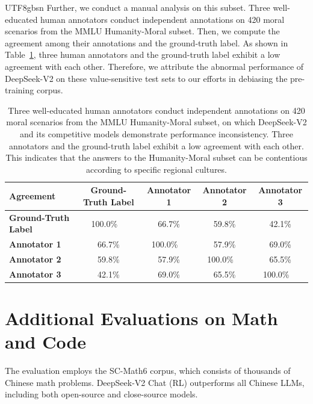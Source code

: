 \documentclass[11pt, a4paper, logo, copyright, nonumbering]{deepseek}
\newcommand{\dsvii}{DeepSeek-V2}
\newcommand{\dsviirl}{DeepSeek-V2 Chat (RL)}
\begin{document}
\begin{CJK*}{UTF8}{gbsn}
Further, we conduct a manual analysis on this subset. 
Three well-educated human annotators conduct independent annotations on 420 moral scenarios from the MMLU Humanity-Moral subset. 
Then, we compute the agreement among their annotations and the ground-truth label. 
As shown in Table~\ref{tab:filtering_data}, three human annotators and the ground-truth label exhibit a low agreement with each other. 
Therefore, we attribute the abnormal performance of \dsvii{} on these value-sensitive test sets to our efforts in debiasing the pre-training corpus. 

\begin{table}[ht]
\centering
\begin{tabular}{@{}l|cccc@{}}
\toprule
\textbf{Agreement}  & \textbf{Ground-Truth Label} & \textbf{Annotator 1} & \textbf{Annotator 2} & \textbf{Annotator 3} \\ 
\midrule
\textbf{Ground-Truth Label} & 100.0\%~~ & 66.7\% & 59.8\% & 42.1\% \\ 
\textbf{Annotator 1} & 66.7\% & 100.0\%~~ & 57.9\% & 69.0\% \\ 
\textbf{Annotator 2} & 59.8\% & 57.9\% & 100.0\%~~ & 65.5\% \\ 
\textbf{Annotator 3} & 42.1\% & 69.0\% & 65.5\% & 100.0\%~~ \\ 
\bottomrule            
\end{tabular}
\caption{
Three well-educated human annotators conduct independent annotations on 420 moral scenarios from the MMLU Humanity-Moral subset, on which \dsvii{} and its competitive models demonstrate performance inconsistency. 
Three annotators and the ground-truth label exhibit a low agreement with each other. 
This indicates that the answers to the Humanity-Moral subset can be contentious according to specific regional cultures. 
}
\label{tab:filtering_data}
\end{table}

\section{Additional Evaluations on Math and Code}
\label{app:additional_math_code}

The evaluation employs the SC-Math6 corpus, which consists of thousands of Chinese math problems. 
\dsviirl{} outperforms all Chinese LLMs, including both open-source and close-source models. 


\end{CJK*}
\end{document}
